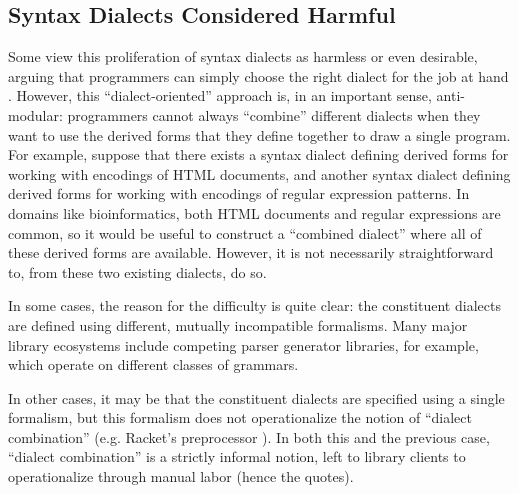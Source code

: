 \subsection{Syntax Dialects Considered Harmful}
Some  view this proliferation of syntax dialects as harmless or even desirable, arguing that programmers can simply choose the right dialect for the job at hand \cite{journals/stp/Ward94}. However, this ``dialect-oriented'' approach is, in an important sense, anti-modular: programmers cannot always ``combine'' different dialects when they want to use the derived forms that they define together to draw a single program. For example, suppose that there exists a syntax dialect defining derived forms for working with encodings of HTML documents, and another syntax dialect defining derived forms for working with encodings of regular expression patterns. In domains like bioinformatics, both HTML documents and regular expressions are common, so it would be useful to construct a ``combined dialect'' where all of these derived forms are available. However, it is not necessarily straightforward to, from these two existing dialects, do so. 

In some cases, the reason for the difficulty is quite clear: the constituent dialects are defined using different, mutually incompatible formalisms. Many major library ecosystems include competing parser generator libraries, for example, which operate on different classes of grammars.

In other cases, it may be that the constituent dialects are specified using a single formalism, but this formalism does not operationalize the notion of ``dialect combination'' (e.g. Racket's preprocessor \cite{Flatt:2012:CLR:2063176.2063195}). In both this and the previous case, ``dialect combination'' is a strictly informal notion, left to library clients to operationalize through manual labor (hence the quotes).


